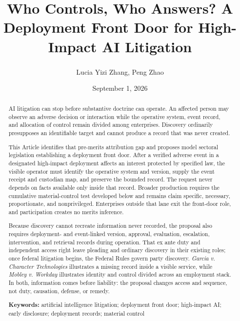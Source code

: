 \documentclass[review=harvardjolt,mode=final,twoside]{americanlawreview}
\title{Who Controls, Who Answers? A Deployment Front Door for High-Impact AI Litigation}
\author{Lucia Yizi Zhang\textsuperscript{\dag}, Peng Zhao\textsuperscript{\dag}}
\date{September 1, 2026}
\begin{document}
\maketitle

\begin{abstract}
AI litigation can stop before substantive doctrine can operate. An affected person may observe an adverse decision or interaction while the operative system, event record, and allocation of control remain divided among enterprises. Discovery ordinarily presupposes an identifiable target and cannot produce a record that was never created.

This Article identifies that pre-merits attribution gap and proposes model sectoral legislation establishing a deployment front door. After a verified adverse event in a designated high-impact deployment affects an interest protected by specified law, the visible operator must identify the operative system and version, supply the event receipt and custodian map, and preserve the bounded record. The request never depends on facts available only inside that record. Broader production requires the cumulative material-control test developed below and remains claim specific, necessary, proportionate, and nonprivileged. Enterprises outside that lane exit the front-door role, and participation creates no merits inference.

Because discovery cannot recreate information never recorded, the proposal also requires deployment- and event-linked version, approval, evaluation, escalation, intervention, and retrieval records during operation. That ex ante duty and independent access right leave pleading and ordinary discovery in their existing roles; once federal litigation begins, the Federal Rules govern party discovery. \emph{Garcia v. Character Technologies} illustrates a missing record inside a visible service, while \emph{Mobley v. Workday} illustrates identity and control divided across an employment stack. In both, information comes before liability: the proposal changes access and sequence, not duty, causation, defense, or remedy.

\noindent\textbf{Keywords:} artificial intelligence litigation; deployment front door; high-impact AI; early disclosure; deployment records; material control
\end{abstract}

\tableofcontents








\end{document}
